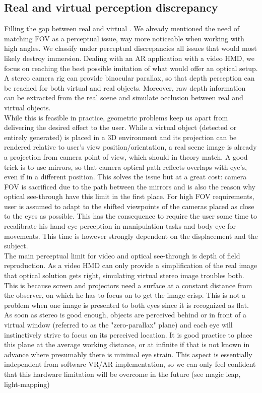 \subsection{Real and virtual perception discrepancy}
Filling the gap between real and virtual . We already mentioned the need of matching FOV as a perceptual issue, way more noticeable when working with high angles. We classify under perceptual discrepancies all issues that would most likely destroy immersion. Dealing with an AR application with a video HMD, we focus on reaching the best possible imitation of what would offer an optical setup. A stereo camera rig can provide binocular parallax, so that depth perception can be reached for both virtual and real objects. Moreover, raw depth information can be extracted from the real scene and simulate occlusion between real and virtual objects.\\
While this is feasible in practice, geometric problems keep us apart from delivering the desired effect to the user. While a virtual object (detected or entirely generated) is placed in a 3D environment and its projection can be rendered relative to user's view position/orientation, a real scene image is already a projection from camera point of view, which should in theory match. A good trick is to use mirrors, so that camera optical path reflects overlaps with eye's, even if in a different position. This solves the issue but at a great cost: camera FOV is sacrificed due to the path between the mirrors and is also the reason why optical see-through have this limit in the first place. For high FOV requirements, user is assumed to adapt to the shifted viewpoints of the cameras placed as close to the eyes as possible. This has the consequence to require the user some time to recalibrate his hand-eye perception in manipulation tasks and body-eye for movements. This time is however strongly dependent on the displacement and the subject.\\
The main perceptual limit for video and optical see-through is depth of field reproduction. As a video HMD can only provide a simplification of the real image that optical solution gets right, simulating virtual stereo image troubles both. This is because screen and projectors need a surface at a constant distance from the observer, on which he has to focus on to get the image crisp. This is not a problem when one image is presented to both eyes since it is recognized as flat. As soon as stereo is good enough, objects are perceived behind or in front of a virtual window (referred to as the "zero-parallax" plane) and each eye will instinctively strive to focus on its perceived location. It is good practice to place this plane at the average working distance, or at infinite if that is not known in advance where presumably there is minimal eye strain. This aspect is essentially independent from software VR/AR implementation, so we can only feel confident that this hardware limitation will be overcome in the future (see magic leap, light-mapping)

